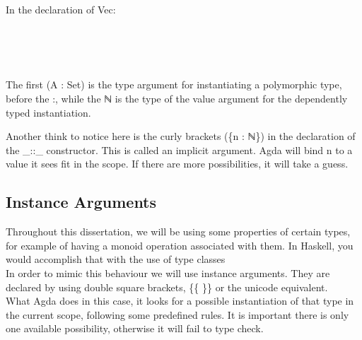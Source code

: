 \documentclass[12pt,twoside,notitlepage]{report}
\begin{document}
  In the declaration of Vec: \\

\begin{code}
\>  \AgdaSymbol{(} \AgdaSymbol{:} \AgdaSymbol{)} \AgdaSymbol{:}    \<%
\\
\>[0]\<[2]%
\>[2]\AgdaInductiveConstructor{[]} \<[6]%
\>[6]\AgdaSymbol{:}   \<%
\\
\>[0]\<[2]%
\>[2] \AgdaSymbol{:}  \AgdaSymbol{\{}\AgdaSymbol{\}}          \AgdaSymbol{(} \AgdaSymbol{)} \<[45]%
\>[45]\<%
\end{code}\\

  The first (A : Set) is the type argument for instantiating a polymorphic type, before the :, while the ℕ is the type of the value argument for
  the dependently typed instantiation.

  Another think to notice here is the curly brackets (\{n : ℕ\}) in the declaration of the \_::\_ constructor.
  This is called an implicit argument. Agda will bind n to a value it sees fit in the scope. If there are more possibilities, it will take a guess.

\subsection{Instance Arguments}

  Throughout this dissertation, we will be using some properties of certain types, for example of having a monoid operation associated with them.
  In Haskell, you would accomplish that with the use of type classes \cite{typeclasses} \\
  In order to mimic this behaviour we will use instance arguments. They are declared by using double square brackets, \{\{ \}\} or the unicode
  equivalent. \\
  What Agda does in this case, it looks for a possible instantiation of that type in the current scope, following some predefined rules. \cite{instanceargs}
  It is important there is only one available possibility, otherwise it will fail to type check.
\end{document}
